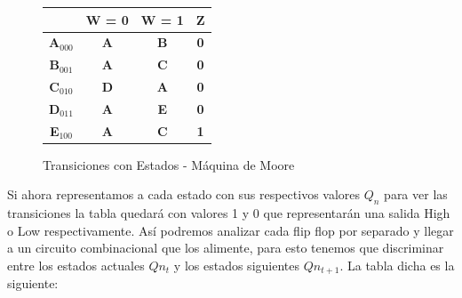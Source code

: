 \documentclass[10pt,a4paper]{article}
\begin{document}
\begin{figure}[H]
\begin{center}
\begin{tabular}{c|c|c|c|}
\cline{2-4}
\textbf{} & \textbf{W = 0} & \textbf{W = 1} & \textbf{Z} \\ \hline
\multicolumn{1}{|c|}{\textbf{A$_{000}$}} & \textbf{A} & \textbf{B} & \textbf{0} \\ \hline
\multicolumn{1}{|c|}{\textbf{B$_{001}$}} & \textbf{A} & \textbf{C} & \textbf{0} \\ \hline
\multicolumn{1}{|c|}{\textbf{C$_{010}$}} & \textbf{D} & \textbf{A} & \textbf{0} \\ \hline
\multicolumn{1}{|c|}{\textbf{D$_{011}$}} & \textbf{A} & \textbf{E} & \textbf{0} \\ \hline
\multicolumn{1}{|c|}{\textbf{E$_{100}$}} & \textbf{A} & \textbf{C} & \textbf{1} \\ \hline
\end{tabular}
\caption{Transiciones con Estados - Máquina de Moore} 
\label{2_fig1}
\end{center}
\end{figure}
Si ahora representamos a cada estado con sus respectivos valores $Q_n$ para ver las transiciones la tabla quedar\'a con valores 1 y 0 que representar\'an una salida High o Low respectivamente. As\'i podremos analizar cada flip flop por separado y llegar a un circuito combinacional que los alimente, para esto tenemos que discriminar entre los estados actuales $Q{n_{t}}$ y los estados siguientes $Q{n_{t+1}}$. La tabla dicha es la siguiente:
\end{document}

